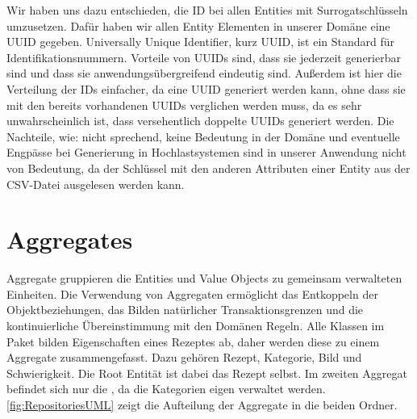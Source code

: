 Wir haben uns dazu entschieden, die ID bei allen Entities mit Surrogatschlüsseln umzusetzen. Dafür haben wir allen Entity Elementen in unserer Domäne eine UUID gegeben. Universally Unique Identifier, kurz UUID, ist ein Standard für Identifikationsnummern. Vorteile von UUIDs sind, dass sie jederzeit generierbar sind und dass sie anwendungsübergreifend eindeutig sind. Außerdem ist hier die Verteilung der IDs einfacher, da eine UUID generiert werden kann, ohne dass sie mit den bereits vorhandenen UUIDs verglichen werden muss, da es sehr unwahrscheinlich ist, dass versehentlich doppelte UUIDs generiert werden. Die Nachteile, wie: nicht sprechend, keine Bedeutung in der Domäne und eventuelle Engpässe bei Generierung in
Hochlastsystemen sind in unserer Anwendung nicht von Bedeutung, da der Schlüssel mit den anderen Attributen einer Entity aus der CSV-Datei ausgelesen werden kann.

\section{Aggregates}
Aggregate gruppieren die Entities und Value Objects zu gemeinsam verwalteten Einheiten. Die Verwendung von Aggregaten ermöglicht das Entkoppeln der Objektbeziehungen, das Bilden natürlicher Transaktionsgrenzen und die kontinuierliche Übereinstimmung mit den Domänen Regeln.
Alle Klassen im Paket \href{https://github.com/MichaelaHaag/RezeptApp/tree/main/3-Domain-Code/src/main/java/de/rezeptapp/domain/Rezept}{} bilden Eigenschaften eines Rezeptes ab, daher werden diese zu einem Aggregate zusammengefasst. Dazu gehören Rezept, Kategorie, Bild und Schwierigkeit. Die Root Entität ist dabei das Rezept selbst. Im zweiten Aggregat befindet sich nur die \href{https://github.com/MichaelaHaag/RezeptApp/tree/main/3-Domain-Code/src/main/java/de/rezeptapp/domain/Kategorie}{}, da die Kategorien eigen verwaltet werden. \autoref{fig:RepositoriesUML} zeigt die Aufteilung der Aggregate in die beiden Ordner. 


